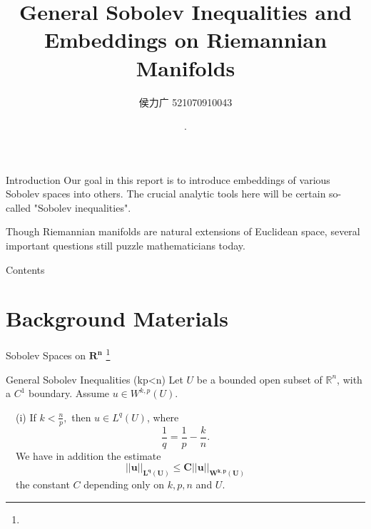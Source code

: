 \documentclass[xcolor=table,dvipsnames,svgnames,aspectratio=169,fontset=fandol]{ctexbeamer}
\author{侯力广  521070910043}
\date{\the\year \,.\the\month \,}
\title[流形上的Soblev不等式与嵌入]
{\textbf{General Sobolev Inequalities and \\Embeddings on Riemannian Manifolds}}
\begin{document}
\maketitle

\begin{frame}{Introduction}
  Our goal in this report is to introduce embeddings of various Sobolev spaces into others. The crucial analytic tools here will be certain so-called "Sobolev inequalities". 

  \vskip 12pt
  Though Riemannian manifolds are natural extensions of Euclidean space, several important questions still puzzle mathematicians today.
\end{frame}


\begin{frame}{Contents}
  \tableofcontents[hideallsubsections]
\end{frame}


\section{Background Materials}

\begin{frame}{Sobolev Spaces on $\mathbf{R^n}$  \footnote{}}
\begin{alertblock}{General Sobolev Inequalities (kp<n)}
  Let $U$ be a bounded open subset of $\mathbb{R}^n$, with a $C^1$ boundary. Assume $u \in W^{k, p}(U)$.
  
  \vskip 5pt
  ~~(i) If $k<\frac{n}{p}, $
  then $u \in L^q(U)$, where
  $$
  \frac{1}{q}=\frac{1}{p}-\frac{k}{n} .
  $$
  ~~We have in addition the estimate
  $$
  \bm
  {||u||_{L^q(U)} \leq C||u||_{W^{k, p}(U)}}
  $$
  ~~the constant $C$ depending only on $k, p, n$ and $U$.
\end{alertblock}
\end{frame}
\end{document}

